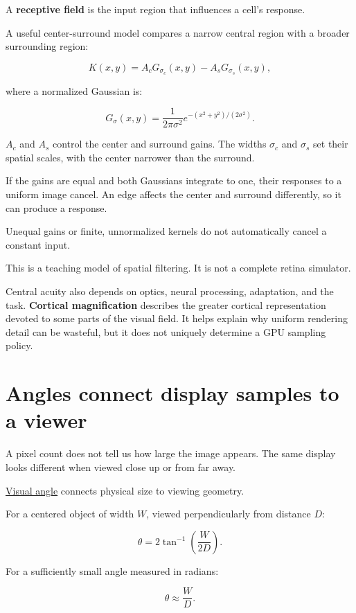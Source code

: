 A \textbf{receptive field} is the input region that influences a cell's response.

A useful center-surround model compares a narrow central region with a broader surrounding region:

\[
K(x,y)=A_cG_{\sigma_c}(x,y)-A_sG_{\sigma_s}(x,y),
\]

where a normalized Gaussian is:

\[
G_\sigma(x,y)=
\frac{1}{2\pi\sigma^2}
e^{-(x^2+y^2)/(2\sigma^2)}.
\]

\(A_c\) and \(A_s\) control the center and surround gains. The widths \(\sigma_c\) and \(\sigma_s\) set their spatial scales, with the center narrower than the surround.

If the gains are equal and both Gaussians integrate to one, their responses to a uniform image cancel. An edge affects the center and surround differently, so it can produce a response.

Unequal gains or finite, unnormalized kernels do not automatically cancel a constant input.

This is a teaching model of spatial filtering. It is not a complete retina simulator.

Central acuity also depends on optics, neural processing, adaptation, and the task. \textbf{Cortical magnification} describes the greater cortical representation devoted to some parts of the visual field. It helps explain why uniform rendering detail can be wasteful, but it does not uniquely determine a GPU sampling policy.

\section{Angles connect display samples to a viewer}\label{04-visual-computing-ii-ch043-angles-connect-display-samples-to-a-viewer}

A pixel count does not tell us how large the image appears. The same display looks different when viewed close up or from far away.

\hyperref[appendix-7d356c396d1a]{Visual angle} connects physical size to viewing geometry.

For a centered object of width \(W\), viewed perpendicularly from distance \(D\):

\[
\theta=2\tan^{-1}\left(\frac{W}{2D}\right).
\]

For a sufficiently small angle measured in radians:

\[
\theta\approx\frac{W}{D}.
\]

